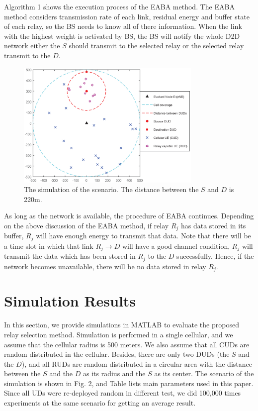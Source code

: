 \documentclass[conference]{IEEEtran}
\begin{document}
Algorithm 1 shows the execution process of the EABA method. The EABA method considers transmission rate of each link, residual energy and buffer state of each relay, so the BS needs to know all of there information. When the link with the highest weight is activated by BS, the BS will notify the whole D2D network either the $S$ should transmit to the selected relay or the selected relay  transmit to the $D$.
\begin{figure}[!t]
\center
\includegraphics[width=3.5in]{fig2}
\caption{The simulation of the scenario. The distance between the $S$ and $D$ is 220m.}
\label{fig_scenario}
\end{figure}

As long as the network is available, the procedure of EABA continues. Depending on the above discussion of the EABA method, if relay $R_j$ has data stored in its buffer, $R_j$ will have enough energy to transmit that data. Note that there will be a time slot in which that link $R_j \rightarrow D$ will have a good channel condition, $R_j$ will transmit the data which has been stored in $R_j$ to the $D$ successfully. Hence, if the network becomes unavailable, there will be no data stored in relay $R_j$.

\section{Simulation Results}
In this section, we provide simulations in MATLAB to evaluate the proposed relay selection method. Simulation is performed in a single cellular, and we assume that the cellular radius is 500 meters. We also assume that all CUDs are random distributed in the cellular. Besides, there are only two DUDs (the $S$ and the $D$), and all RUDs are random distributed in  a circular area with the distance between the $S$ and the $D$ as its radius and the $S$ as its center. The scenario of the simulation is shown in Fig. 2, and Table \uppercase\expandafter{} lists main parameters used in this paper. Since all UDs were re-deployed random in different test, we did 100,000 times experiments at the same scenario for getting an average result.
\end{document}
